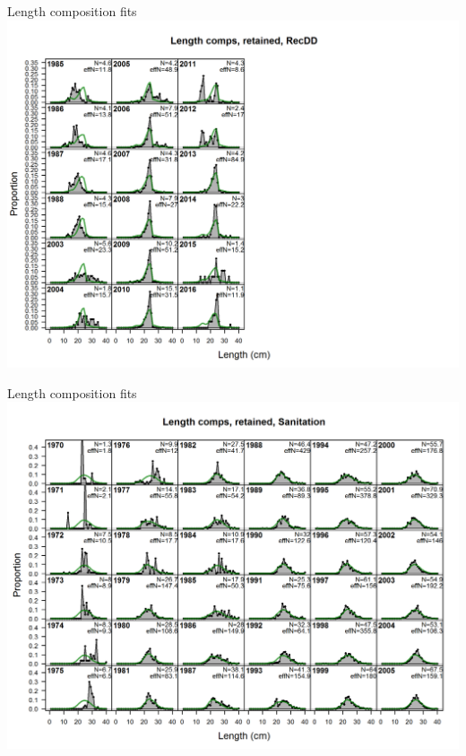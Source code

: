 \documentclass[ignorenonframetext,]{beamer}
\begin{document}
\begin{frame}{Length composition fits}\includegraphics{./r4ss/plots_mod1/comp_lenfit_flt6mkt2.png}\end{frame}

\begin{frame}{Length composition fits}\includegraphics{./r4ss/plots_mod1/comp_lenfit_flt7mkt2_page1.png}\end{frame}
\end{document}
